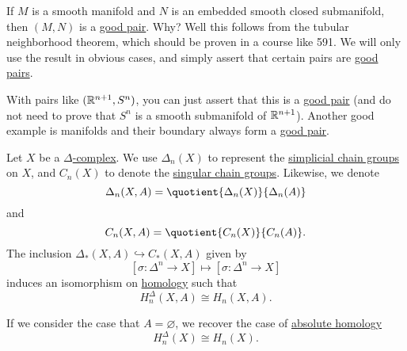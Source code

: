 \begin{remark}
	If \(M\) is a smooth manifold and \(N\) is an embedded smooth closed submanifold, then \((M, N)\) is a \hyperref[def:good-pair]{good pair}.
	Why? Well this follows from the tubular neighborhood theorem, which should be proven in a course like 591. We will only use the result
	in obvious cases, and simply assert that certain pairs are \hyperref[def:good-pair]{good pairs}.
\end{remark}

With pairs like \((\mathbb{\MakeUppercase{r}}^{n + 1}, S^n)\), you can just assert that this is a \hyperref[def:good-pair]{good pair} (and do
not need to prove that \(S^n\) is a smooth submanifold of \(\mathbb{\MakeUppercase{r}}^{n + 1}\)). Another good example is manifolds and their
boundary always form a \hyperref[def:good-pair]{good pair}.

\begin{theorem}\label{thm:singular-homology-agrees-with-simplicial-homology}
	Let \(X\) be a \hyperref[def:delta-complex]{\(\Delta\)-complex}. We use \(\Delta_n(X)\) to represent the
	\hyperref[def:simplicial-complex]{simplicial chain groups} on \(X\), and \(C_n(X)\) to denote the
	\hyperref[def:singular-chain]{singular chain groups}. Likewise, we denote
	\[
		\Delta_n(X, A) = \quotient{\Delta_n(X)}{\Delta_n(A)}
	\]
	and
	\[
		C_n(X, A) = \quotient{C_n(X)}{C_n(A)}.
	\]
	The inclusion \(\Delta_\ast(X, A) \hookrightarrow C_\ast(X, A)\) given by
	\[
		[\sigma \colon \Delta^n \to X] \mapsto [\sigma : \Delta^n \to X]
	\]
	induces an isomorphism on \hyperref[def:homology-group]{homology} such that
	\[
		H_n^\Delta(X, A) \cong H_n(X, A).
	\]

	If we consider the case that \(A = \varnothing\), we recover the case of \hyperref[def:homology-group]{absolute homology}
	\[
		H_n^\Delta(X) \cong H_n(X).
	\]
\end{theorem}

